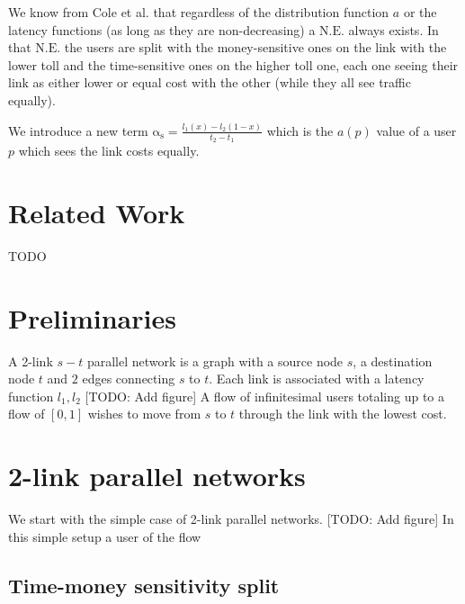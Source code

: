 \documentclass[10pt,a4paper]{book}
\newcommand{\NE}{\mathrm{N.E.}}
\newcommand{\as}{\mathrm{\alpha_s}}
\theoremstyle{definition}
\theoremstyle{comment}
\begin{document}
We know from Cole et al. \cite{10.1145/780542.780618} that regardless of the distribution function $a$ or the latency functions (as long as they are non-decreasing) a $\NE$ always exists.
In that $\NE$ the users are split with the money-sensitive ones on the link with the lower toll and the time-sensitive ones on the higher toll one, each one seeing their link as either lower or equal cost with the other (while they all see traffic equally).

We introduce a new term $\as=\frac{l_1(x)-l_2(1-x)}{t_2-t_1}$ which is the $a(p)$ value of a user $p$ which sees the link costs equally.


\chapter{Related Work}
TODO


\chapter{Preliminaries}

A 2-link $s-t$ parallel network is a graph with a source node $s$, a destination node $t$ and $2$ edges connecting $s$ to $t$.
Each link is associated with a latency function $l_1, l_2$
[TODO: Add figure]
A flow of infinitesimal users totaling up to a flow of $[0, 1]$ wishes to move from $s$ to $t$ through the link with the lowest cost.


\chapter{2-link parallel networks}

We start with the simple case of 2-link parallel networks.
[TODO: Add figure]
In this simple setup a user of the flow 

\section{Time-money sensitivity split}
\end{document}
